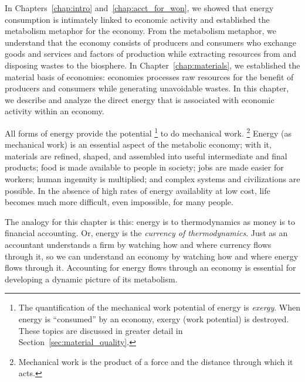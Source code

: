 



In Chapters~\ref{chap:intro} and~\ref{chap:acct_for_won}, 
we showed that energy consumption is intimately linked to economic activity
and established the metabolism metaphor for the economy.
From the metabolism metaphor, we understand that the economy 
consists of producers and consumers who exchange
goods and services and factors of production 
while extracting resources from and disposing wastes to the biosphere. 
In Chapter~\ref{chap:materials}, we established the material basis of economies: 
economies processes
raw resources for the benefit of producers and consumers 
while generating unavoidable wastes.
In this chapter, we describe and analyze the 
direct energy
that is associated with economic activity within an economy.

All forms of energy provide the potential%
	\footnote{
	The quantification of the mechanical work potential of energy is \emph{exergy}.
	When energy is ``consumed'' by an economy, exergy (work potential) is destroyed.
	These topics are discussed in greater detail in Section~\ref{sec:material_quality}.
	}
to do mechanical work.%
	\footnote{
	Mechanical work is the product of a force and the distance
	through which it acts.
	}
Energy (as mechanical work) 
is an essential aspect of the metabolic economy;
with it, materials are refined, shaped, and assembled
into useful intermediate and final products; 
food is made available to people in society; 
jobs are made easier for workers;
human ingenuity is multiplied;
and complex systems and civilizations are possible.
In the absence of high rates of energy availablity at low cost,
life becomes much more difficult, even impossible, for many people.

The analogy for this chapter is this: 
energy is to thermodynamics as money is to financial accounting.
Or, energy is the \emph{currency of thermodynamics}.
Just as an accountant understands a firm by watching how and where
currency flows through it, so we can understand an economy by watching
how and where energy flows through it.
Accounting for energy flows through an economy
is essential for developing a dynamic picture 
of its metabolism.

